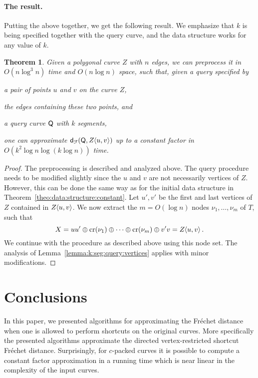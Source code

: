 \documentclass[12pt]{article}
\newtheorem{theorem}{Theorem}[section]
\newcommand{\seclab}[1]{\label{sec:#1}}
\newcommand{\thmlab}[1]{{\label{theo:#1}}}
\newcommand{\thmref}[1]{Theorem~\ref{theo:#1}}
\newcommand{\lemref}[1]{Lemma~\ref{lemma:#1}}
\newcommand{\ts}{\hspace{0.6pt}}
\newcommand{\Frechet}{Fr\'{e}c{h}e{}t\xspace}\providecommand{\Arr}{\mathop{\mathrm{\EuScript{A}}}}
\newcommand{\distFr}[2]{\mathsf{d}_{\EuScript{F}}\pth{#1, #2}}
\newcommand{\SimplifyX}[1]{#1}
\newcommand{\cZ}{{Z}}
\newcommand{\cXBase}{X} \newcommand{\cYBase}{Y} \newcommand{\crvCBase}{{\pi}}
\newcommand{\cX}{\SimplifyX{\cXBase}}
\providecommand{\pth}[2][\!]{#1\left({#2}\right)}
\newcommand{\concatOp}{\oplus}
\newcommand{\SC}[3]{{#1}\!\!\ts\ts \left\langle  #2, #3 \right\rangle}
\newcommand{\Tree}{T}
\newcommand{\node}{\nu}
\newcommand{\cNode}[1]{\mathrm{c{}r}\pth{#1}}
\newcommand{\segX}[2]{{#1}{#2}}
\numberwithin{figure}{section}
\numberwithin{equation}{section}
\newcommand{\vrestricted}{vertex-restricted}
\newcommand{\asymmetric}{directed}
\begin{document}
\paragraph{The result.}
Putting the above together, we get the following result. We emphasize
that $k$ is being specified together with the query curve, and the
data structure works for any value of $k$.

\begin{theorem}
    \thmlab{k:seg:query:result}Given a polygonal curve $\cZ$ with $n$ edges, we can preprocess it
    in $O(n \log^3 n )$ time and $O(n \log n)$ space, such that, given
    a query specified by
    \begin{compactenum}[\quad(i)]
        \item a pair of points $u$ and $v$ on the curve $\cZ$,
        \item the edges containing these two points, and
        \item a query curve $\mathsf{Q}$ with $k$ segments,
    \end{compactenum}
    one can approximate $\distFr{\cQ}{\SC{\cZ}{u}{v}}$ up to a
    constant factor in $O\pth{ k^2 \log n \log (k \log n ) }$ time.
\end{theorem}

\begin{proof}
    The preprocessing is described and analyzed above. The query
    procedure needs to be modified slightly since the $u$ and $v$ are
    not necessarily vertices of $\cZ$. However, this can be done the
    same way as for the initial data structure in
    \thmref{data:structure:constant}.  Let $u',v'$ be the first and
    last vertices of $\cZ$ contained in $\SC{\cZ}{u}{v}$. We now
    extract the $m=O(\log n)$ nodes $\node_1,\dots,\node_m$ of
    $\Tree$, such that
    \[\cX=\segX{u}{u'} \concatOp \cNode{\node_1}
    \concatOp \dots \concatOp \cNode{\node_m} \concatOp \segX{v'}{v} =
    \SC{\cZ}{u}{v}.\] We continue with the procedure as described
    above using this node set.  The analysis of
    \lemref{k:seg:query:vertices} applies with minor modifications.
\end{proof}






\section{Conclusions}
\seclab{conclusions}


In this paper, we presented algorithms for approximating the \Frechet
distance when one is allowed to perform shortcuts on the original
curves. More specifically the presented algorithms approximate the
\asymmetric{} \vrestricted{} shortcut \Frechet distance.
Surprisingly, for $c$-packed curves it is possible to compute a
constant factor approximation in a running time which is near linear
in the complexity of the input curves.
\end{document}
